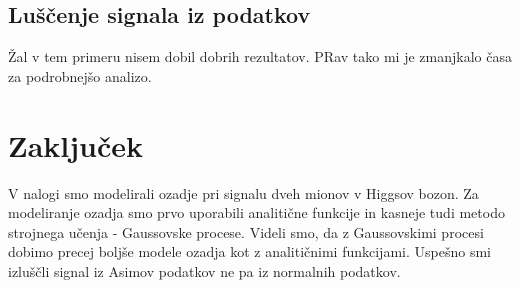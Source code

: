 \documentclass[slovene,11pt,a4paper]{article}
\begin{document}
\subsection{Luščenje signala iz podatkov}

Žal v tem primeru nisem dobil dobrih rezultatov. PRav tako mi je zmanjkalo časa za podrobnejšo analizo.

\newpage

\section{Zaključek}

V nalogi smo modelirali ozadje pri signalu dveh mionov v Higgsov bozon. Za modeliranje ozadja smo prvo uporabili analitične funkcije in kasneje tudi metodo strojnega učenja - Gaussovske procese. Videli smo, da z Gaussovskimi procesi dobimo precej boljše modele ozadja kot z analitičnimi funkcijami. Uspešno smi izluščli signal iz Asimov podatkov ne pa iz normalnih podatkov.
\end{document}
